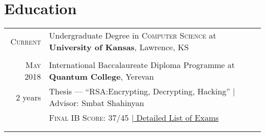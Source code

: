 \documentclass[a4paper,10pt]{article}
\begin{document}
      
\section{Education}
\begin{tabular}{rl}

  \textsc{Current} & Undergraduate Degree in \textsc{Computer Science} at \normalsize\textbf{University of Kansas}, Lawrence, KS\\
  \\
  
  \textsc{May} 2018& International Baccalaureate Diploma Programme at \textbf{Quantum College}, Yerevan\\
  2 years&Thesis --- ``RSA:\@ Encrypting, Decrypting, Hacking'' | Advisor: Smbat Shahinyan\\
&\textsc{Final IB Score}: 37/45 \hyperlink{ib_grades}{\hfill| \footnotesize Detailed List of Exams}\\&\\


\\
  
\end{tabular}


\end{document}
